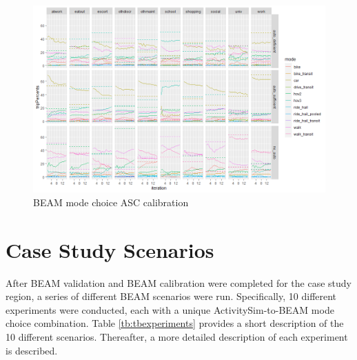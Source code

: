 \documentclass[12pt, oneside, openright]{byuthesis}
\begin{document}
\begin{figure}

{\centering \includegraphics[width=1\linewidth]{pics/BeamCalib} 

}

\caption{BEAM mode choice ASC calibration}\label{fig:fig-beam-calib}
\end{figure}

\hypertarget{case-study-scenarios}{%
\section{Case Study Scenarios}\label{case-study-scenarios}}

After BEAM validation and BEAM calibration were completed for the case study region, a series of different BEAM scenarios were run. Specifically, 10 different experiments were conducted, each with a unique ActivitySim-to-BEAM mode choice combination. Table \ref{tb:tbexperiments} provides a short description of the 10 different scenarios. Thereafter, a more detailed description of each experiment is described.

\begin{table}

\caption{\label{tab:tbexperiments}ActivitySim - BEAM Mode Choice Combination Scenario Description}
\centering
{}
\end{table}
\end{document}
